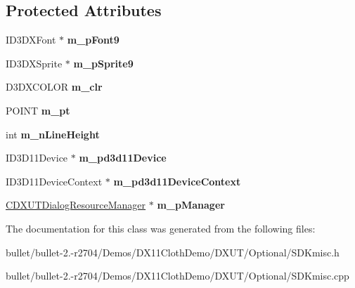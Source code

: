 \subsection*{Protected Attributes}
\begin{DoxyCompactItemize}
\item 
\hypertarget{class_c_d_x_u_t_text_helper_ad8846741751fd35d87fa75a42eb83c50}{I\+D3\+D\+X\+Font $\ast$ {\bfseries m\+\_\+p\+Font9}}\label{class_c_d_x_u_t_text_helper_ad8846741751fd35d87fa75a42eb83c50}

\item 
\hypertarget{class_c_d_x_u_t_text_helper_a39d84491933c8e20ac1e30e6b27342dd}{I\+D3\+D\+X\+Sprite $\ast$ {\bfseries m\+\_\+p\+Sprite9}}\label{class_c_d_x_u_t_text_helper_a39d84491933c8e20ac1e30e6b27342dd}

\item 
\hypertarget{class_c_d_x_u_t_text_helper_abda1eaccbab210b030c9386f73462502}{D3\+D\+X\+C\+O\+L\+O\+R {\bfseries m\+\_\+clr}}\label{class_c_d_x_u_t_text_helper_abda1eaccbab210b030c9386f73462502}

\item 
\hypertarget{class_c_d_x_u_t_text_helper_af7ee38b69c0c1686a73cb9f52ea492a7}{P\+O\+I\+N\+T {\bfseries m\+\_\+pt}}\label{class_c_d_x_u_t_text_helper_af7ee38b69c0c1686a73cb9f52ea492a7}

\item 
\hypertarget{class_c_d_x_u_t_text_helper_a2ac874c5600959730dfb09c17ac88dc2}{int {\bfseries m\+\_\+n\+Line\+Height}}\label{class_c_d_x_u_t_text_helper_a2ac874c5600959730dfb09c17ac88dc2}

\item 
\hypertarget{class_c_d_x_u_t_text_helper_af8ce238af2d4be8d004c56fce9656bf6}{I\+D3\+D11\+Device $\ast$ {\bfseries m\+\_\+pd3d11\+Device}}\label{class_c_d_x_u_t_text_helper_af8ce238af2d4be8d004c56fce9656bf6}

\item 
\hypertarget{class_c_d_x_u_t_text_helper_a561afac27a4db269f4d2cebdf535a91d}{I\+D3\+D11\+Device\+Context $\ast$ {\bfseries m\+\_\+pd3d11\+Device\+Context}}\label{class_c_d_x_u_t_text_helper_a561afac27a4db269f4d2cebdf535a91d}

\item 
\hypertarget{class_c_d_x_u_t_text_helper_acee8110a8933d6cb178dde86c3bd5a54}{\hyperlink{class_c_d_x_u_t_dialog_resource_manager}{C\+D\+X\+U\+T\+Dialog\+Resource\+Manager} $\ast$ {\bfseries m\+\_\+p\+Manager}}\label{class_c_d_x_u_t_text_helper_acee8110a8933d6cb178dde86c3bd5a54}

\end{DoxyCompactItemize}


The documentation for this class was generated from the following files\+:\begin{DoxyCompactItemize}
\item 
bullet/bullet-\/2.-\/r2704/\+Demos/\+D\+X11\+Cloth\+Demo/\+D\+X\+U\+T/\+Optional/S\+D\+Kmisc.\+h\item 
bullet/bullet-\/2.-\/r2704/\+Demos/\+D\+X11\+Cloth\+Demo/\+D\+X\+U\+T/\+Optional/S\+D\+Kmisc.\+cpp\end{DoxyCompactItemize}
